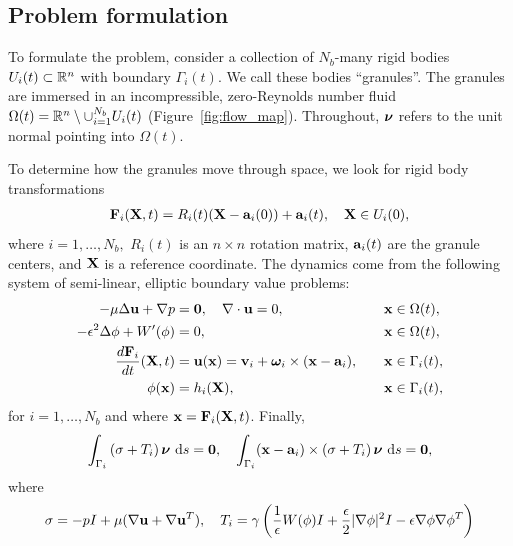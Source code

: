 \subsection{Problem formulation}
To formulate the problem, consider a collection of $N_b$-many rigid
bodies $U_i(t) \subset \RR^n$ with boundary $\Gamma_i(t)$. We call these
bodies ``granules''. The granules are immersed in an incompressible,
zero-Reynolds number fluid $\Omega(t) = \RR^n \setminus \cup_{i=1}^{N_b}
U_i(t)$ (Figure~\ref{fig:flow_map}). Throughout, $\nnu$ refers to
the unit normal pointing into $\Omega(t)$.

To determine how the granules move through space, we look for rigid body
transformations
\begin{align}
\label{eq:RBT}
  \FF_i(\XX,t) = R_i(t)(\XX - \aa_i(0)) + \aa_i(t),\quad \XX \in U_i(0),
\end{align}
where $i = 1,\ldots,N_b,$ $R_i(t)$ is an $n
\times n$ rotation matrix, $\aa_i(t)$ are the granule centers, and $\XX$ is a
reference coordinate.
The dynamics come from the following system of semi-linear, elliptic boundary value problems:
\begin{alignat}{4}
  \label{eqn:stokes} 
  -\mu\Delta \uu + \nabla p &= \mathbf{0}, 
  \quad \nabla \cdot \uu = 0, &&\xx \in \Omega(t), \\
  \label{eqn:phase}
  -\epsilon^2 \Delta \phi + W'(\phi) &= 0, &&\xx \in \Omega(t),\\
  \label{eqn:noslip}        
  \frac{d\FF_i}{dt}(\XX,t) & = \uu(\xx) = 
    \vv_i + \oomega_i \times (\xx - \aa_i), 
  \quad &&\xx \in \Gamma_i(t),\\
  \label{eqn:material}
  \phi(\xx) &= h_i(\XX),  &&\xx \in \Gamma_i(t),
\end{alignat}
for $i=1,\ldots,N_b$ and where $\xx = \FF_i(\XX,t)$. Finally,
\begin{align}
\label{eqn:stressbalance}
\int_{\Gamma_i} \left(\sigma  + T_i\right)\nnu \,\dif s = \mathbf{0},\quad
\int_{\Gamma_i} (\xx - \aa_i)\times \left(\sigma + T_i\right) \nnu
  \,\dif s = \mathbf{0},
\end{align}
where
\begin{align}
\label{eqn:hydro_stress}
\sigma = -pI + \mu(\nabla \uu + \nabla \uu^T),\quad 
T_i = \gamma\left(\frac{1}{\epsilon}W(\phi)I + \frac{\epsilon}{2}|\nabla \phi|^2I - \epsilon \nabla \phi \nabla \phi^T\right)
\end{align}
